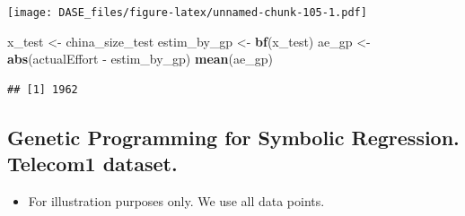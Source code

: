 \documentclass[]{book}
\newenvironment{Shaded}{\begin{snugshade}}{\end{snugshade}}
\newcommand{\KeywordTok}[1]{\textcolor[rgb]{0.13,0.29,0.53}{\textbf{{#1}}}}
\newcommand{\DataTypeTok}[1]{\textcolor[rgb]{0.13,0.29,0.53}{{#1}}}
\newcommand{\DecValTok}[1]{\textcolor[rgb]{0.00,0.00,0.81}{{#1}}}
\newcommand{\StringTok}[1]{\textcolor[rgb]{0.31,0.60,0.02}{{#1}}}
\newcommand{\NormalTok}[1]{{#1}}
\providecommand{\tightlist}{%
  \setlength{\itemsep}{0pt}\setlength{\parskip}{0pt}}
\begin{document}
\begin{Shaded}
\end{Shaded}

\texttt{[image: DASE\_files/figure-latex/unnamed-chunk-105-1.pdf]}

\begin{Shaded}
\begin{Highlighting}[]
\NormalTok{x_test <-}\StringTok{ }\NormalTok{china_size_test}
\NormalTok{estim_by_gp <-}\StringTok{ }\KeywordTok{bf}\NormalTok{(x_test)}
\NormalTok{ae_gp <-}\StringTok{ }\KeywordTok{abs}\NormalTok{(actualEffort -}\StringTok{ }\NormalTok{estim_by_gp)}
\KeywordTok{mean}\NormalTok{(ae_gp)}
\end{Highlighting}
\end{Shaded}

\begin{verbatim}
## [1] 1962
\end{verbatim}

\subsection{Genetic Programming for Symbolic Regression. Telecom1
dataset.}\label{genetic-programming-for-symbolic-regression.-telecom1-dataset.}

\begin{itemize}
\tightlist
\item
  For illustration purposes only. We use all data points.
\end{itemize}
\end{document}
